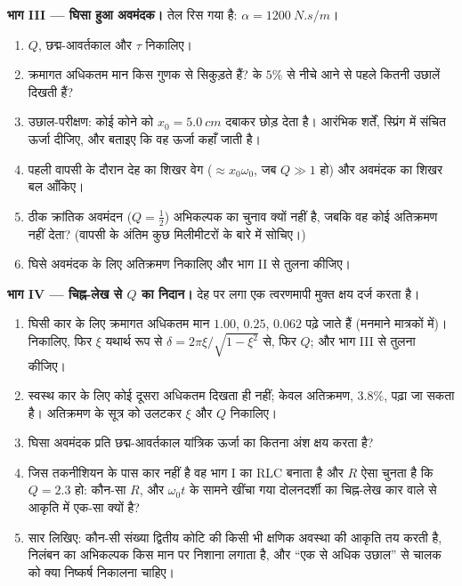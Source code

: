\begin{problem}
\medskip
\noindent\textbf{भाग III --- घिसा हुआ अवमंदक।}
तेल रिस गया है: $\alpha = \qty{1200}{N.s/m}$।
\begin{enumerate}[resume]
  \item $Q$, छद्म-आवर्तकाल और $\tau$ निकालिए।
  \item क्रमागत अधिकतम मान किस गुणक से सिकुड़ते हैं?  के $5\%$ से नीचे
        आने से पहले कितनी उछालें दिखती हैं?
  \item उछाल-परीक्षण: कोई कोने को $x_0 =
        \qty{5.0}{cm}$ दबाकर छोड़ देता है। आरंभिक शर्तें, स्प्रिंग में
        संचित ऊर्जा दीजिए, और बताइए कि वह ऊर्जा कहाँ जाती है।
  \item पहली वापसी के दौरान देह का शिखर वेग
        ($\approx x_0\omega_0$, जब $Q \gg 1$ हो) और अवमंदक का शिखर बल
        आँकिए।
  \item ठीक क्रांतिक अवमंदन ($Q = \tfrac12$) अभिकल्पक का चुनाव क्यों नहीं
        है, जबकि वह कोई अतिक्रमण नहीं देता? (वापसी के अंतिम कुछ
        मिलीमीटरों के बारे में सोचिए।)
  \item घिसे अवमंदक के लिए अतिक्रमण निकालिए और भाग II से तुलना कीजिए।
\end{enumerate}

\medskip
\noindent\textbf{भाग IV --- चिह्न-लेख से $Q$ का निदान।}
देह पर लगा एक त्वरणमापी मुक्त क्षय दर्ज करता है।
\begin{enumerate}[resume]
  \item घिसी कार के लिए क्रमागत अधिकतम मान $1.00$, $0.25$, $0.062$
        पढ़े जाते हैं (मनमाने मात्रकों में)।  निकालिए,
        फिर $\xi$ यथार्थ रूप से $\delta = 2\pi\xi/\sqrt{1 - \xi^2}$ से, फिर $Q$;
        और भाग III से तुलना कीजिए।
  \item स्वस्थ कार के लिए कोई दूसरा अधिकतम दिखता ही नहीं; केवल
        अतिक्रमण, $3.8\%$, पढ़ा जा सकता है। अतिक्रमण के सूत्र को उलटकर
        $\xi$ और $Q$ निकालिए।
  \item घिसा अवमंदक प्रति छद्म-आवर्तकाल यांत्रिक ऊर्जा का कितना अंश क्षय
        करता है?
  \item जिस तकनीशियन के पास कार नहीं है वह भाग I का RLC बनाता है और
        $R$ ऐसा चुनता है कि $Q = 2.3$ हो: कौन-सा $R$, और $\omega_0 t$ के
        सामने खींचा गया दोलनदर्शी का चिह्न-लेख कार वाले से आकृति में
        एक-सा क्यों है?
  \item सार लिखिए: कौन-सी  संख्या द्वितीय कोटि की किसी भी क्षणिक
        अवस्था की आकृति तय करती है, निलंबन का अभिकल्पक किस मान पर निशाना
        लगाता है, और ``एक से अधिक उछाल'' से चालक को क्या निष्कर्ष निकालना
        चाहिए।
\end{enumerate}
\end{problem}
